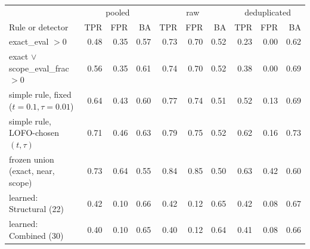 \begin{tabular}{lrrrrrrrrr}\toprule
 & \multicolumn{3}{c}{pooled} & \multicolumn{3}{c}{raw} & \multicolumn{3}{c}{deduplicated}\\
Rule or detector & TPR & FPR & BA & TPR & FPR & BA & TPR & FPR & BA\\\midrule
exact\_eval $>0$ & 0.48 & 0.35 & 0.57 & 0.73 & 0.70 & 0.52 & 0.23 & 0.00 & 0.62\\
exact $\lor$ scope\_eval\_frac $>0$ & 0.56 & 0.35 & 0.61 & 0.74 & 0.70 & 0.52 & 0.38 & 0.00 & 0.69\\
simple rule, fixed ($t{=}0.1,\tau{=}0.01$) & 0.64 & 0.43 & 0.60 & 0.77 & 0.74 & 0.51 & 0.52 & 0.13 & 0.69\\
simple rule, LOFO-chosen $(t,\tau)$ & 0.71 & 0.46 & 0.63 & 0.79 & 0.75 & 0.52 & 0.62 & 0.16 & 0.73\\
frozen union (exact, near, scope) & 0.73 & 0.64 & 0.55 & 0.84 & 0.85 & 0.50 & 0.63 & 0.42 & 0.60\\
learned: Structural (22) & 0.42 & 0.10 & 0.66 & 0.42 & 0.12 & 0.65 & 0.42 & 0.08 & 0.67\\
learned: Combined (30) & 0.40 & 0.10 & 0.65 & 0.40 & 0.12 & 0.64 & 0.41 & 0.08 & 0.66\\
\bottomrule\end{tabular}
